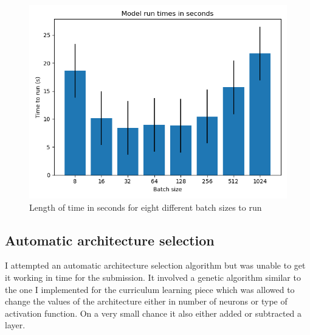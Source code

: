 \documentclass[conference]{IEEEtran}
\begin{document}
\begin{figure}
  \includegraphics[width=\linewidth]{figs/batch_size_times.png}
  \caption{Length of time in seconds for eight different batch sizes to run}
  \label{fig:batch_size_time}
\end{figure}


\subsection{Automatic architecture selection}
I attempted an automatic architecture selection algorithm but was unable to get it working in time for the submission.
It involved a genetic algorithm similar to the one I implemented for the curriculum learning piece which was allowed to change the values of the architecture either in number of neurons or type of activation function. On a very small chance it also either added or subtracted a layer.
\end{document}
